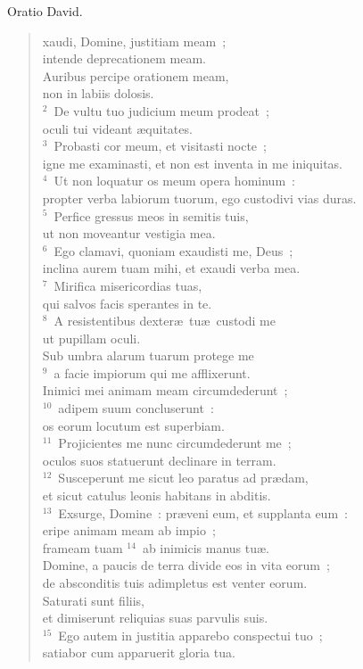 \bchapter[Psalm]
Oratio David. \begin{verse}xaudi, Domine, justitiam meam~;\\ intende deprecationem meam.\\ Auribus percipe orationem meam,\\ non in labiis dolosis.\\
${}^{2}$~De vultu tuo judicium meum prodeat~;\\ oculi tui videant \ae quitates.\\
${}^{3}$~Probasti cor meum, et visitasti nocte~;\\ igne me examinasti, et non est inventa in me iniquitas.\\
${}^{4}$~Ut non loquatur os meum opera hominum~:\\ propter verba labiorum tuorum, ego custodivi vias duras.\\
${}^{5}$~Perfice gressus meos in semitis tuis,\\ ut non moveantur vestigia mea.\\
${}^{6}$~Ego clamavi, quoniam exaudisti me, Deus~;\\ inclina aurem tuam mihi, et exaudi verba mea.\\
${}^{7}$~Mirifica misericordias tuas,\\ qui salvos facis sperantes in te.\\
${}^{8}$~A resistentibus dexter\ae\ tu\ae\ custodi me\\ ut pupillam oculi.\\ Sub umbra alarum tuarum protege me\\
${}^{9}$~a facie impiorum qui me afflixerunt.\\ Inimici mei animam meam circumdederunt~;\\
${}^{10}$~adipem suum concluserunt~:\\ os eorum locutum est superbiam.\\
${}^{11}$~Projicientes me nunc circumdederunt me~;\\ oculos suos statuerunt declinare in terram.\\
${}^{12}$~Susceperunt me sicut leo paratus ad pr\ae dam,\\ et sicut catulus leonis habitans in abditis.\\
${}^{13}$~Exsurge, Domine~: pr\ae veni eum, et supplanta eum~:\\ eripe animam meam ab impio~;\\ frameam tuam
${}^{14}$~ab inimicis manus tu\ae .\\ Domine, a paucis de terra divide eos in vita eorum~;\\ de absconditis tuis adimpletus est venter eorum.\\ Saturati sunt filiis,\\ et dimiserunt reliquias suas parvulis suis.\\
${}^{15}$~Ego autem in justitia apparebo conspectui tuo~;\\ satiabor cum apparuerit gloria tua.\end{verse}



